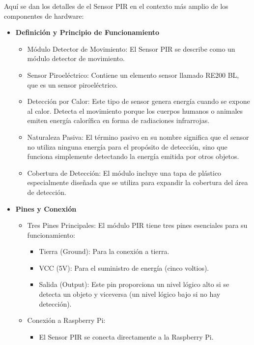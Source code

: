 \documentclass{report}
\begin{document}
Aquí se dan los detalles de el Sensor PIR en el contexto más amplio de los componentes de hardware:
\begin{itemize}

    \item \textbf{Definición y Principio de Funcionamiento}
    \begin{itemize}
        \item Módulo Detector de Movimiento: El Sensor PIR se describe como un módulo detector de movimiento.
        \item Sensor Piroeléctrico: Contiene un elemento sensor llamado RE200 BL, que es un sensor piroeléctrico.
        \item Detección por Calor: Este tipo de sensor genera energía cuando se expone al calor. Detecta el movimiento porque los cuerpos humanos 
        o animales emiten energía calorífica en forma de radiaciones infrarrojas.
        \item Naturaleza Pasiva: El término pasivo en su nombre significa que el sensor no utiliza ninguna energía para el propósito de detección, 
        sino que funciona simplemente detectando la energía emitida por otros objetos.
        \item Cobertura de Detección: El módulo incluye una tapa de plástico especialmente diseñada que se utiliza para expandir la cobertura del 
        área de detección.
    \end{itemize}

    \item \textbf{Pines y Conexión}
    \begin{itemize}
        \item Tres Pines Principales: El módulo PIR tiene tres pines esenciales para su funcionamiento:
        \begin{itemize}
            \item Tierra (Ground): Para la conexión a tierra.
            \item VCC (5V): Para el suministro de energía (cinco voltios).
            \item Salida (Output): Este pin proporciona un nivel lógico alto si se detecta un objeto y viceversa (un nivel lógico bajo si no hay detección).
        \end{itemize}

        \item Conexión a Raspberry Pi:
        \begin{itemize}
            \item El Sensor PIR se conecta directamente a la Raspberry Pi.
        \end{itemize}
    \end{itemize}
    

\end{itemize}
\end{document}
